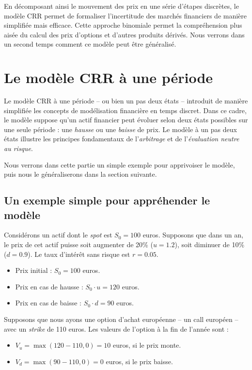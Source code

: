 \documentclass[12pt,a4paper]{article}
\begin{document}
En décomposant ainsi le mouvement des prix en une série d'étapes discrètes, le modèle CRR permet de formaliser l'incertitude des marchés financiers de manière simplifiée mais efficace. Cette approche binomiale permet la compréhension plus aisée du calcul des prix d'options et d'autres produits dérivés. Nous verrons dans un second temps comment ce modèle peut être généralisé.

\section{Le modèle CRR à une période}

Le modèle CRR à une période -- ou bien un pas deux états -- introduit de manière simplifiée les concepts de modélisation financière en temps discret. Dans ce cadre, le modèle suppose qu'un actif financier peut évoluer selon deux états possibles sur une seule période : une \textit{hausse} ou une \textit{baisse} de prix. Le modèle à un pas deux états illustre les principes fondamentaux de l'\textit{arbitrage} et de l'\textit{évaluation neutre au risque}.

Nous verrons dans cette partie un simple exemple pour apprivoiser le modèle, puis nous le généraliserons dans la section suivante.

\subsection{Un exemple simple pour appréhender le modèle}

Considérons un actif dont le \textit{spot} est \( S_0 = 100 \) euros. Supposons que dans un an, le prix de cet actif puisse soit augmenter de 20\% (\( u = 1.2 \)), soit diminuer de 10\% (\( d = 0.9 \)). Le taux d'intérêt sans risque est \( r = 0.05 \).

\begin{itemize}
    \item Prix initial : \( S_0 = 100 \) euros.
    \item Prix en cas de hausse : \( S_0 \cdot u = 120 \) euros.
    \item Prix en cas de baisse : \( S_0 \cdot d = 90 \) euros.
\end{itemize}

Supposons que nous ayons une option d'achat européenne -- un call européen -- avec un \textit{strike} de 110 euros. Les valeurs de l'option à la fin de l'année sont :

\begin{itemize}
    \item \( V_u = \max(120 - 110, 0) = 10 \) euros, si le prix monte.
    \item \( V_d = \max(90 - 110, 0) = 0 \) euros, si le prix baisse.
\end{itemize}
\end{document}

